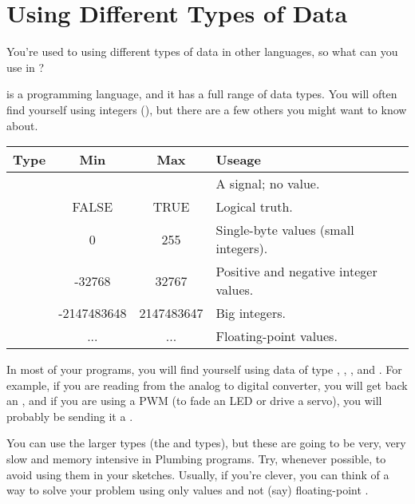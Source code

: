 \seealso

\XXX

% 

\section{Using Different Types of Data}

\problem
You're used to using different types of data in other languages, so what can you use in \occam?


\solution
\occam is a programming language, and it has a full range of data types. You will often find yourself using integers (\INT), but there are a few others you might want to know about.


	\begin{tabular}{l|c|c|p{1in}}
		\hline
		Type & Min & Max & Useage \\
		\hline
		\SIGNALT & & & A signal; no value. \\
		\BOOL & FALSE & TRUE & Logical truth. \\
		\BYTE & 0 & 255 & Single-byte values (small integers). \\
		\INT & -32768 & 32767 & Positive and negative integer values. \\
		\INTTT &  -2147483648 & 2147483647 & Big integers. \\
		\REALTT & ... & ... & Floating-point values. \\
		\hline
	\end{tabular}

\discussion
In most of your programs, you will find yourself using data of type \SIGNALT, \BOOL, \BYTE, and \INT. For example, if you are reading from the analog to digital converter, you will get back an \INT, and if you are using a PWM \PROC (to fade an LED or drive a servo), you will probably be sending it a \BYTE. 

You can use the larger types (the \INTTT and \REALTT types), but these are going to be very, very slow and memory intensive in Plumbing programs. Try, whenever possible, to avoid using them in your sketches. Usually, if you're clever, you can think of a way to solve your problem using only \INT values and not (say) floating-point \REALTT.

\seealso

\XXX

% 

\problem

\solution

\discussion

\makingthingsbreak

\seealso

\XXX